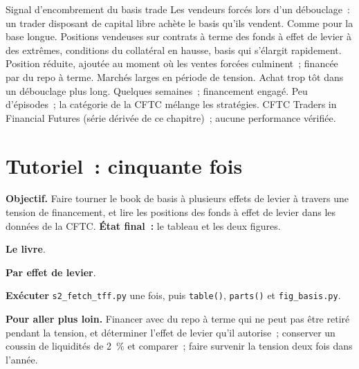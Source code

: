 \begin{strategyfile}{Signal d'encombrement du basis trade}\label{strat:s2:the-bond-futures-basis-trade:crowding}
 Les vendeurs forcés lors d'un débouclage~: un trader disposant de capital libre achète le basis qu'ils vendent.
 Comme pour la base longue.
 Positions vendeuses sur contrats à terme des fonds à effet de levier à des extrêmes, conditions du collatéral en hausse, basis qui s'élargit rapidement.
 Position réduite, ajoutée au moment où les ventes forcées culminent~; financée par du repo à terme.
 Marchés larges en période de tension.
 Achat trop tôt dans un débouclage plus long.
 Quelques semaines~; financement engagé.
 Peu d'épisodes~; la catégorie de la CFTC mélange les stratégies.
 CFTC Traders in Financial Futures (série dérivée de ce chapitre)~; aucune performance vérifiée.
\end{strategyfile}

\section{Tutoriel~: cinquante fois}\label{tut:s2:the-bond-futures-basis-trade:tut}

\begin{tutorial}
\textbf{Objectif.} Faire tourner le book de basis à plusieurs effets de levier à travers une tension de financement, et lire les positions des fonds à effet de levier dans les données de la CFTC.
\textbf{État final~:} le tableau et les deux figures.
\begin{tutsteps}
\item \textbf{Le livre}.
\label{lst:s2:the-bond-futures-basis-trade:book}
\item \textbf{Par effet de levier}.
\label{lst:s2:the-bond-futures-basis-trade:table}
\item \textbf{Exécuter} \texttt{s2\_fetch\_tff.py} une fois, puis \texttt{table()}, \texttt{parts()} et \texttt{fig\_basis.py}.
\end{tutsteps}
\textbf{Pour aller plus loin.} Financer avec du repo à terme qui ne peut pas être retiré pendant la tension, et déterminer l'effet de levier qu'il autorise~; conserver un coussin de liquidités
de 2~\% et comparer~; faire survenir la tension deux fois dans l'année.
\end{tutorial}

